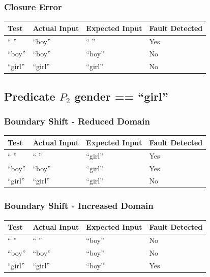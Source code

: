 \documentclass[11pt, oneside]{article}   	%
\begin{document}
\subsubsection{Closure Error}
\begin{table}[!htb]
\centering
\begin{tabular}{|l|l|l|l|}
\hline
Test   & Actual Input & Expected Input & Fault Detected \\ \hline
“ ”    & “boy”        & “ ”            & Yes            \\ \hline
“boy”  & “boy”        & “boy”          & No             \\ \hline
“girl” & “girl”       & “girl”         & No             \\ \hline
\end{tabular}
\end{table}
\newpage

\subsection{Predicate $P_2$ gender == ``girl''}
\subsubsection{Boundary Shift - Reduced Domain}
\begin{table}[!htb]
\centering
\begin{tabular}{|l|l|l|l|}
\hline
Test   & Actual Input & Expected Input & Fault Detected \\ \hline
“ ”    & “ ”          & “girl”         & Yes            \\ \hline
“boy”  & “boy”        & “girl”         & Yes            \\ \hline
“girl” & “girl”       & “girl”         & No             \\ \hline
\end{tabular}
\end{table}

\subsubsection{Boundary Shift - Increased Domain}
\begin{table}[!htb]
\centering
\begin{tabular}{|l|l|l|l|}
\hline
Test   & Actual Input & Expected Input & Fault Detected \\ \hline
“ ”    & “ ”          & “boy”          & No             \\ \hline
“boy”  & “boy”        & “boy”          & No             \\ \hline
“girl” & “girl”       & “boy”          & Yes            \\ \hline
\end{tabular}
\end{table}
\end{document}
